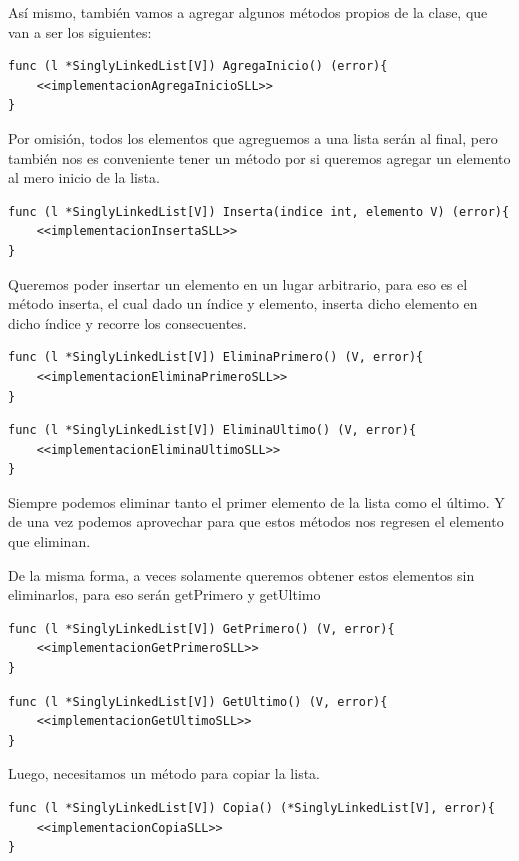 \documentclass[11pt]{article}
\begin{document}
Así mismo, también vamos a agregar algunos métodos propios de la clase, que van a ser los siguientes:

\begin{verbatim}
func (l *SinglyLinkedList[V]) AgregaInicio() (error){
	<<implementacionAgregaInicioSLL>>
}
\end{verbatim}

Por omisión, todos los elementos que agreguemos a una lista serán al final, pero también nos es conveniente tener un método por si queremos agregar un elemento al mero inicio de la lista.

\begin{verbatim}
func (l *SinglyLinkedList[V]) Inserta(indice int, elemento V) (error){
	<<implementacionInsertaSLL>>
}
\end{verbatim}

Queremos poder insertar un elemento en un lugar arbitrario,  para eso es el método inserta, el cual dado un índice y elemento, inserta dicho elemento en dicho índice y recorre los consecuentes.

\begin{verbatim}
func (l *SinglyLinkedList[V]) EliminaPrimero() (V, error){
	<<implementacionEliminaPrimeroSLL>>
}
\end{verbatim}

\begin{verbatim}
func (l *SinglyLinkedList[V]) EliminaUltimo() (V, error){
	<<implementacionEliminaUltimoSLL>>
}
\end{verbatim}

Siempre podemos eliminar tanto el primer elemento de la lista como el último. Y de una vez podemos aprovechar para que estos métodos nos regresen el elemento que eliminan.

De la misma forma, a veces solamente queremos obtener estos elementos sin eliminarlos, para eso serán getPrimero y getUltimo

\begin{verbatim}
func (l *SinglyLinkedList[V]) GetPrimero() (V, error){
	<<implementacionGetPrimeroSLL>>
}
\end{verbatim}

\begin{verbatim}
func (l *SinglyLinkedList[V]) GetUltimo() (V, error){
	<<implementacionGetUltimoSLL>>
}
\end{verbatim}

Luego, necesitamos un método para copiar la lista.

\begin{verbatim}
func (l *SinglyLinkedList[V]) Copia() (*SinglyLinkedList[V], error){
	<<implementacionCopiaSLL>>
}
\end{verbatim}
\end{document}
